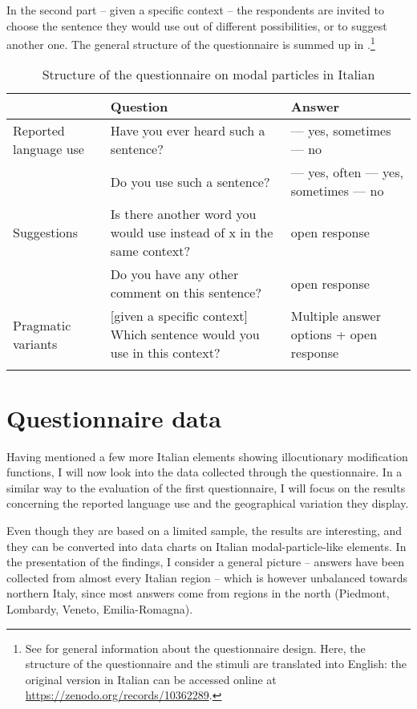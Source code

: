 In the second part – given a specific context – the respondents are invited to choose the sentence they would use out of different possibilities, or to suggest another one. The general structure of the questionnaire is summed up in .\footnote{See  for general information about the questionnaire design. Here, the structure of the questionnaire and the stimuli are translated into English: the original version in Italian can be accessed online at \url{https://zenodo.org/records/10362289}.}

\begin{table}
\begin{tabularx}{\textwidth}{XXQ}
\lsptoprule
 & Question & Answer\\
\midrule
 Reported
language use & Have you ever heard such a sentence? & {}--- yes, sometimes
\newline {}--- no\\
 & Do you use such a sentence? & {}--- yes, often
\newline {}--- yes, sometimes
\newline {}--- no\\
\tablevspace
Suggestions & Is there another word you would use instead of x in the same context? & open response\\
& Do you have any other comment on this sentence? & open response\\
\tablevspace
Pragmatic variants & [given a specific context]
\newline Which sentence would you use in this context? & Multiple answer options + open response\\
\lspbottomrule
\end{tabularx}
\caption{\label{tab:key:9.1} Structure of the questionnaire on modal particles in Italian}
\end{table}

\section{Questionnaire data}
\hypertarget{Toc124860685}{}
Having mentioned a few more Italian elements showing illocutionary modification functions, I will now look into the data collected through the questionnaire. In a similar way to the evaluation of the first questionnaire, I will focus on the results concerning the reported language use and the geographical variation they display.

Even though they are based on a limited sample, the results are interesting, and they can be converted into data charts on Italian modal-particle-like elements. In the presentation of the findings, I consider a general picture – answers have been collected from almost every Italian region – which is however unbalanced towards northern Italy, since most answers come from regions in the north (Piedmont, Lombardy, Veneto, Emilia-Romagna).

